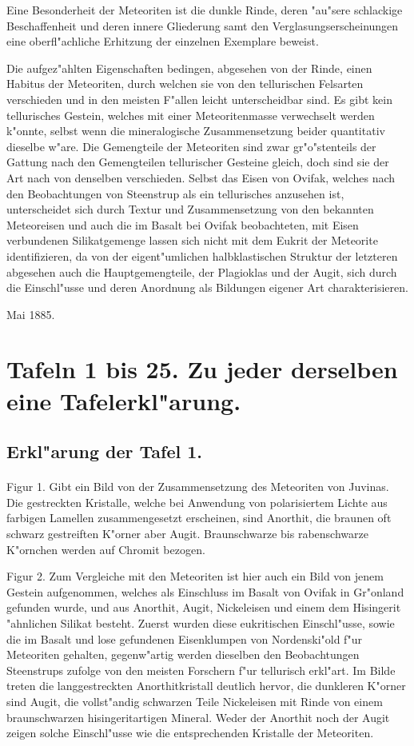 \documentclass[a4paper, 11pt, oneside, polutonikogreek, german]{article}
\begin{document}
Eine Besonderheit der Meteoriten ist die dunkle Rinde, deren "au"sere schlackige Beschaffenheit und deren innere Gliederung samt den Verglasungserscheinungen eine oberfl"achliche Erhitzung der einzelnen Exemplare beweist.

Die aufgez"ahlten Eigenschaften bedingen, abgesehen von der Rinde, einen Habitus der Meteoriten, durch welchen sie von den tellurischen Felsarten verschieden und in den meisten F"allen leicht unterscheidbar sind. Es gibt kein tellurisches Gestein, welches mit einer Meteoritenmasse verwechselt werden k"onnte, selbst wenn die mineralogische Zusammensetzung beider quantitativ dieselbe w"are. Die Gemengteile der Meteoriten sind zwar gr"o"stenteils der Gattung nach den Gemengteilen tellurischer Gesteine gleich, doch sind sie der Art nach von denselben verschieden. Selbst das Eisen von Ovifak, welches nach den Beobachtungen von Steenstrup als ein tellurisches anzusehen ist, unterscheidet sich durch Textur und Zusammensetzung von den bekannten Meteoreisen und auch die im Basalt bei Ovifak beobachteten, mit Eisen verbundenen Silikatgemenge lassen sich nicht mit dem Eukrit der Meteorite identifizieren, da von der eigent"umlichen halbklastischen Struktur der letzteren abgesehen auch die Hauptgemengteile, der Plagioklas und der Augit, sich durch die Einschl"usse und deren Anordnung als Bildungen eigener Art charakterisieren.

Mai 1885.
\clearpage
\pagestyle{fancy}
\fancyhf{}
\section{Tafeln 1 bis 25. Zu jeder derselben eine Tafelerkl"arung.}
\subsection{Erkl"arung der Tafel 1.}
\paragraph{}
Figur 1. Gibt ein Bild von der Zusammensetzung des Meteoriten von Juvinas. Die gestreckten Kristalle, welche bei Anwendung von polarisiertem Lichte aus farbigen Lamellen zusammengesetzt erscheinen, sind Anorthit, die braunen oft schwarz gestreiften K"orner aber Augit. Braunschwarze bis rabenschwarze K"ornchen werden auf Chromit bezogen.

Figur 2. Zum Vergleiche mit den Meteoriten ist hier auch ein Bild von jenem Gestein aufgenommen, welches als Einschluss im Basalt von Ovifak in Gr"onland gefunden wurde, und aus Anorthit, Augit, Nickeleisen und einem dem Hisingerit "ahnlichen Silikat besteht. Zuerst wurden diese eukritischen Einschl"usse, sowie die im Basalt und lose gefundenen Eisenklumpen von Nordenski"old f"ur Meteoriten gehalten, gegenw"artig werden dieselben den Beobachtungen Steenstrups zufolge von den meisten Forschern f"ur tellurisch erkl"art. Im Bilde treten die langgestreckten Anorthitkristall deutlich hervor, die dunkleren K"orner sind Augit, die vollst"andig schwarzen Teile Nickeleisen mit Rinde von einem braunschwarzen hisingeritartigen Mineral. Weder der Anorthit noch der Augit zeigen solche Einschl"usse wie die entsprechenden Kristalle der Meteoriten.
\end{document}
